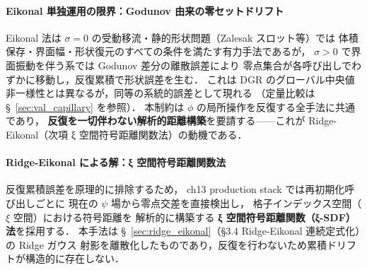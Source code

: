 \paragraph*{Eikonal 単独運用の限界：Godunov 由来の零セットドリフト}
Eikonal 法は $\sigma{=}0$ の受動移流・静的形状問題（Zalesak スロット等）では
体積保存・界面幅・形状復元のすべての条件を満たす有力手法であるが，
$\sigma>0$ で界面振動を伴う系では Godunov 差分の離散誤差により
零点集合が各呼び出しでわずかに移動し，反復累積で形状誤差を生む．
これは DGR のグローバル中央値非一様性とは異なるが，同等の系統的誤差として現れる
（定量比較は §~\ref{sec:val_capillary} を参照）．
本制約は $\phi$ の局所操作を反復する全手法に共通であり，
\textbf{反復を一切伴わない解析的距離構築}を要請する——これが
Ridge-Eikonal（次項 ξ 空間符号距離関数法）の動機である．


\paragraph*{Ridge-Eikonal による解：ξ 空間符号距離関数法}
反復累積誤差を原理的に排除するため，
ch13 production stack では再初期化呼び出しごとに
現在の $\psi$ 場から零点交差を直接検出し，
格子インデックス空間（$\xi$ 空間）における符号距離を
解析的に構築する \textbf{ξ 空間符号距離関数（ξ-SDF）法}を採用する．
本手法は §~\ref{sec:ridge_eikonal}（§3.4 Ridge-Eikonal 連続定式化）の Ridge ガウス
射影を離散化したものであり，反復を行わないため累積ドリフトが構造的に存在しない．

